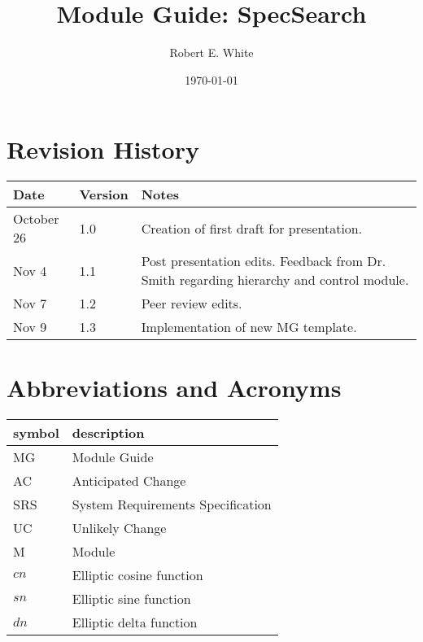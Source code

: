 \documentclass[12pt, titlepage]{article}
\begin{document}
\title{Module Guide: SpecSearch} 
\author{Robert E. White}
\date{\today}

\maketitle
\section{Revision History}

\begin{tabularx}{\textwidth}{p{3cm}p{2cm}X}
\toprule {\bf Date} & {\bf Version} & {\bf Notes}\\
\midrule
October 26 & 1.0 & Creation of first draft for presentation.\\ 
Nov 4 & 1.1 & Post presentation edits. Feedback from Dr. Smith regarding 
hierarchy and control module.\\
Nov 7 & 1.2 & Peer review edits. \\ 
Nov 9 & 1.3 & Implementation of new MG template. \\ 
\bottomrule
\end{tabularx}

\newpage

\tableofcontents

\listoftables

\listoffigures
\section*{Abbreviations and Acronyms}

\renewcommand{\arraystretch}{1.2}
\begin{tabular}{l l} 
	\toprule		
	\textbf{symbol} & \textbf{description}\\
	\midrule 
	MG & Module Guide\\
	AC & Anticipated Change\\ 
	SRS & System Requirements Specification\\ 
	UC & Unlikely Change\\
	M & Module\\ 
	$cn$ & Elliptic cosine function\\ 
	$sn$ & Elliptic sine function\\ 
	$dn$ & Elliptic delta function \\ 
	\bottomrule
\end{tabular}\\
\end{document}
